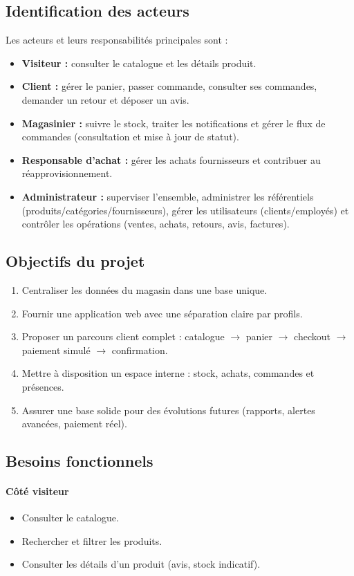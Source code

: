 \documentclass[12pt,a4paper]{report}
\begin{document}
\subsection{Identification des acteurs}
Les acteurs et leurs responsabilités principales sont :
\begin{itemize}
    \item \textbf{Visiteur :} consulter le catalogue et les détails produit.
    \item \textbf{Client :} gérer le panier, passer commande, consulter ses commandes, demander un retour et déposer un avis.
    \item \textbf{Magasinier :} suivre le stock, traiter les notifications et gérer le flux de commandes (consultation et mise à jour de statut).
    \item \textbf{Responsable d'achat :} gérer les achats fournisseurs et contribuer au réapprovisionnement.
    \item \textbf{Administrateur :} superviser l’ensemble, administrer les référentiels (produits/catégories/fournisseurs), gérer les utilisateurs (clients/employés) et contrôler les opérations (ventes, achats, retours, avis, factures).
\end{itemize}

\subsection{Objectifs du projet}
\begin{enumerate}
    \item Centraliser les données du magasin dans une base unique.
    \item Fournir une application web avec une séparation claire par profils.
    \item Proposer un parcours client complet : catalogue $\rightarrow$ panier $\rightarrow$ checkout $\rightarrow$ paiement simulé $\rightarrow$ confirmation.
    \item Mettre à disposition un espace interne : stock, achats, commandes et présences.
    \item Assurer une base solide pour des évolutions futures (rapports, alertes avancées, paiement réel).
\end{enumerate}

\subsection{Besoins fonctionnels}
\paragraph{Côté visiteur}
\begin{itemize}
    \item Consulter le catalogue.
    \item Rechercher et filtrer les produits.
    \item Consulter les détails d’un produit (avis, stock indicatif).
\end{itemize}
\end{document}
